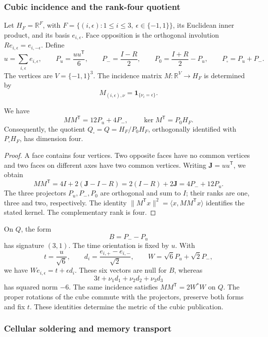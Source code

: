 \subsubsection{Cubic incidence and the rank-four quotient}
\label{ii:vii:sec:cociente-pantalla}

Let \(H_F=\mathbb R^F\), with
\(F=\{(i,\epsilon):1\leq i\leq3,\ \epsilon\in\{-1,1\}\}\),
its Euclidean inner product, and its basis \(e_{i,\epsilon}\).
Face opposition is the orthogonal involution
\(Re_{i,\epsilon}=e_{i,-\epsilon}\). Define
\[
 u=\sum_{i,\epsilon}e_{i,\epsilon},\qquad
 P_u=\frac{uu^{\mathsf T}}6,\qquad P_-=\frac{I-R}{2},\qquad
 P_0=\frac{I+R}{2}-P_u,\qquad P_\square=P_u+P_-.
\]
The vertices are \(V=\{-1,1\}^3\). The incidence matrix
\(M:\mathbb R^V\longrightarrow H_F\) is determined by
\[
 M_{(i,\epsilon),\nu}=\mathbf1_{\{\nu_i=\epsilon\}}.
\]

\begin{proposition}
\label{ii:vii:prop:incidencia}
We have
\[
 MM^{\mathsf T}=12P_u+4P_-,
 \qquad
 \ker M^{\mathsf T}=P_0H_F.
\]
Consequently, the quotient
\(Q_\square=Q=H_F/P_0H_F\), orthogonally identified with
\(P_\square H_F\), has dimension four.
\end{proposition}

\begin{proof}
A face contains four vertices. Two opposite faces have no common
vertices and two faces on different axes have two common vertices.
Writing \(\mathbf J=uu^{\mathsf T}\), we obtain
\[
 MM^{\mathsf T}=4I+2(\mathbf J-I-R)
 =2(I-R)+2\mathbf J=4P_-+12P_u.
\]
The three projectors \(P_u,P_-,P_0\) are orthogonal and sum to \(I\);
their ranks are one, three and two, respectively. The identity
\(\|M^{\mathsf T}x\|^2=\langle x,MM^{\mathsf T}x\rangle\)
identifies the stated kernel. The complementary rank is four.
\end{proof}

On \(Q\), the form
\[
 B=P_--P_u
\]
has signature \((3,1)\). The time orientation is fixed by \(u\).
With
\[
 t=\frac{u}{\sqrt6},\qquad
 d_i=\frac{e_{i,+}-e_{i,-}}{\sqrt2},\qquad
 W=\sqrt6P_u+\sqrt2P_-,
\]
we have \(We_{i,\epsilon}=t+\epsilon d_i\). These six vectors
are null for \(B\), whereas
\[
 3t+\nu_1d_1+\nu_2d_2+\nu_3d_3
\]
has squared norm \(-6\). The same incidence satisfies
\(MM^{\mathsf T}=2W^*W\) on \(Q\). The proper rotations of the cube
commute with the projectors, preserve both forms and fix \(t\).
These identities determine the metric of the cubic publication.

\subsubsection{Cellular soldering and memory transport}
\label{ii:vii:sec:soldadura-celular}


